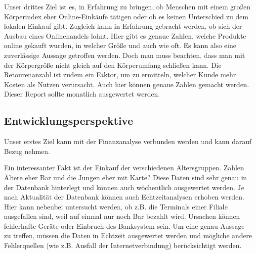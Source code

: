 Unser drittes Ziel ist es, in Erfahrung zu bringen, ob Menschen mit einem großen Körperindex eher Online-Einkäufe tätigen oder ob es keinen Unterschied zu dem lokalen Einkauf gibt. Zugleich kann in Erfahrung gebracht werden, ob sich der Ausbau eines Onlinehandels lohnt. Hier gibt es genaue Zahlen, welche Produkte online gekauft wurden, in welcher Größe und auch wie oft. Es kann also eine zuverlässige Aussage getroffen werden. Doch man muss beachten, dass man mit der Körpergröße nicht gleich auf den Körperumfang schließen kann. Die Retourenanzahl ist zudem ein Faktor, um zu ermitteln, welcher Kunde mehr Kosten als Nutzen verursacht. Auch hier können genaue Zahlen gemacht werden. Dieser Report sollte monatlich ausgewertet werden.
 
 
\subsection*{Entwicklungsperspektive}
 
Unser erstes Ziel kann mit der Finanzanalyse verbunden werden und kann darauf Bezug nehmen.
 
Ein interessanter Fakt ist der Einkauf der verschiedenen Altersgruppen. Zahlen Ältere eher Bar und die Jungen eher mit Karte? Diese Daten sind sehr genau in der Datenbank hinterlegt und können auch wöchentlich ausgewertet werden. Je nach Aktualität der Datenbank können auch Echtzeitanalysen erhoben werden. Hier kann nebenbei untersucht werden, ob z.B. die Terminals einer Filiale ausgefallen sind, weil auf einmal nur noch Bar bezahlt wird. Ursachen können fehlerhafte Geräte oder Einbruch des Banksystem sein. Um eine genau Aussage zu treffen, müssen die Daten in Echtzeit ausgewertet werden und mögliche andere Fehlerquellen (wie z.B. Ausfall der Internetverbindung) berücksichtigt werden.

\pagebreak
